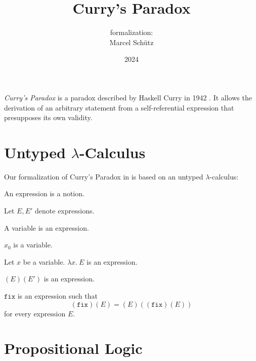 \documentclass[english]{article}
\title{Curry's Paradox}
\author{\Naproche formalization:\\[0.5em]Marcel Schütz}
\date{2024}
\newcommand{\varzero}{x_0}
\newcommand{\abs}[2]{\lambda#1.\ #2}
\newcommand{\app}[2]{(#1)(#2)}
\newcommand{\fix}{\texttt{fix}}
\begin{document}
  \maketitle

  \noindent \emph{Curry's Paradox} is a paradox described by Haskell Curry in 
  1942 \cite{Curry1942}.
  It allows the derivation of an arbitrary statement from a self-referential 
  expression that presupposes its own validity.

  \section*{Untyped $\lambda$-Calculus}

  \noindent Our formalization of Curry's Paradox in \Naproche is based on an 
  untyped $\lambda$-calculus:

  \begin{forthel}

    \begin{signature*}
      An expression is a notion.
    \end{signature*}
  
    Let $E, E'$ denote expressions.
  
    \begin{signature*}
      A variable is an expression.
    \end{signature*}
  
    \begin{signature*}
      $\varzero$ is a variable.
    \end{signature*}
  
    \begin{signature*}[Abstraction]\label{abstraction}
      Let $x$ be a variable.
      $\abs{x}{E}$ is an expression.
    \end{signature*}
  
    \begin{signature*}[Application]\label{application}
      $\app{E}{E'}$ is an expression.
    \end{signature*}
  
    \begin{signature*}\label{fixed_point_combinator}
      $\fix$ is an expression such that
      \[\app{\fix}{E} = \app{E}{\app{\fix}{E}}\]
      for every expression $E$.
    \end{signature*}
  \end{forthel}


  \section*{Propositional Logic}
\end{document}
